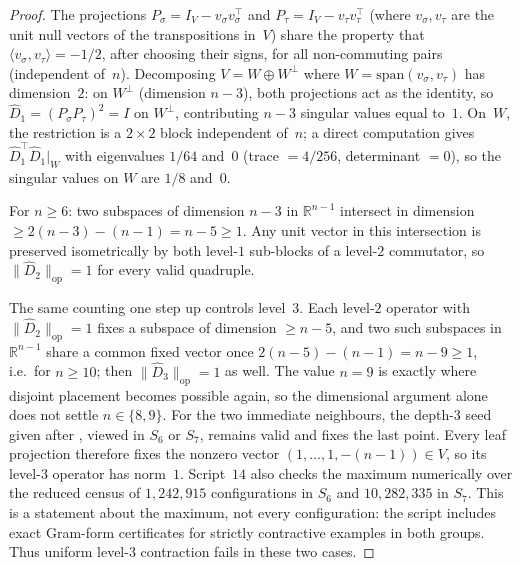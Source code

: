 \documentclass[version=final]{iacrcc}
\newcommand{\norm}[1]{\lVert #1 \rVert}
\newcommand{\opn}[1]{\norm{#1}_{\mathrm{op}}}
\newcommand{\Dhat}{\widehat{D}}
\begin{document}
\begin{proof}
The projections $P_\sigma = I_V - v_\sigma v_\sigma^\top$ and
$P_\tau = I_V - v_\tau v_\tau^\top$ (where $v_\sigma, v_\tau$ are the unit
null vectors of the transpositions in~$V$) share the property that
$\langle v_\sigma, v_\tau \rangle = -1/2$, after choosing their signs, for all non-commuting pairs
(independent of~$n$). Decomposing $V = W \oplus W^\perp$ where
$W = \mathrm{span}(v_\sigma, v_\tau)$ has dimension~$2$: on $W^\perp$
(dimension $n-3$), both projections act as the identity, so
$\Dhat_1 = (P_\sigma P_\tau)^2 = I$ on $W^\perp$, contributing $n-3$
singular values equal to~$1$. On~$W$, the restriction is a $2 \times 2$
block independent of~$n$; a direct computation gives
$\Dhat_1^\top \Dhat_1\big|_W$ with eigenvalues $1/64$ and~$0$
(trace $= 4/256$, determinant $= 0$), so the singular values on $W$
are $1/8$ and~$0$.

For $n \geq 6$: two subspaces of dimension $n-3$ in $\mathbb{R}^{n-1}$
intersect in dimension $\geq 2(n-3) - (n-1) = n-5 \geq 1$. Any unit vector
in this intersection is preserved isometrically by both level-$1$ sub-blocks
of a level-$2$ commutator, so $\opn{\Dhat_2} = 1$ for every valid quadruple.

The same counting one step up controls level~$3$. Each level-$2$ operator with
$\opn{\Dhat_2} = 1$ fixes a subspace of dimension $\geq n-5$, and two such
subspaces in $\mathbb{R}^{n-1}$ share a common fixed vector once
$2(n-5)-(n-1) = n-9 \geq 1$, i.e.\ for $n \geq 10$; then $\opn{\Dhat_3} = 1$ as
well. The value $n = 9$ is exactly where disjoint placement becomes possible
again, so the dimensional argument alone does not settle $n \in \{8,9\}$. For the
two immediate neighbours, the depth-$3$ seed given after
, viewed in $S_6$ or $S_7$, remains valid and fixes
the last point. Every leaf projection therefore fixes the nonzero vector
$(1,\ldots,1,-(n-1))\in V$, so its level-$3$ operator has norm~$1$.
Script~$14$ also checks the maximum numerically over the reduced census of
$1{,}242{,}915$ configurations in $S_6$ and $10{,}282{,}335$ in $S_7$.
This is a statement about the maximum, not every configuration: the script
includes exact Gram-form certificates for strictly contractive examples in
both groups. Thus uniform level-$3$ contraction fails in these two cases.
\end{proof}
\end{document}
